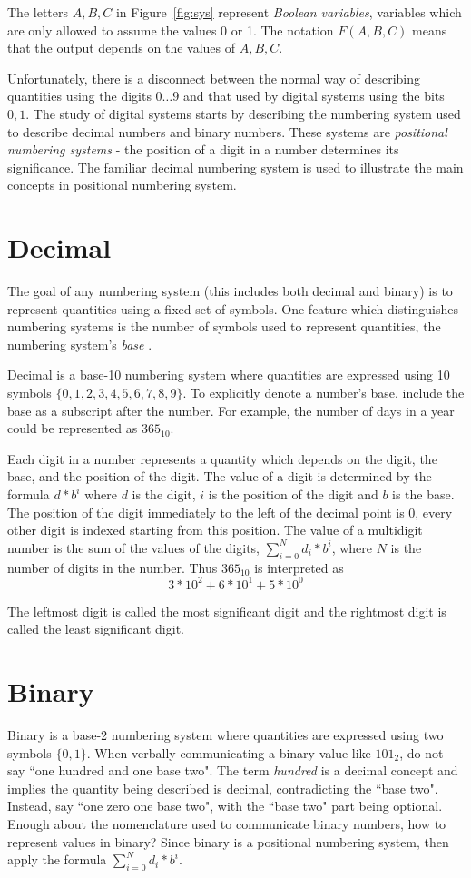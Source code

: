 The letters $A,B,C$ in Figure~\ref{fig:sys} represent {\it Boolean variables}, 
 variables which are only allowed to assume the values 
0 or 1.  The notation $F(A,B,C)$ means that the output depends on the values 
of $A,B,C$. 

Unfortunately, there is a disconnect between the normal way of describing
quantities using the digits $0 \ldots 9$ and that used by digital systems
using the bits $0,1$.  The study of digital systems starts by describing
the numbering system used to describe decimal numbers and binary numbers.  
These systems are
{\it positional numbering systems}  
- the position of a digit in a number determines its significance.  The
familiar decimal numbering system is used to illustrate the main concepts
in positional numbering system.

\section{Decimal}
The goal of any numbering system (this includes both
decimal and binary) is to represent quantities using a fixed set of
symbols.  One feature which distinguishes numbering systems is 
the number of symbols used to represent quantities, the numbering 
system's {\it base} .

Decimal is a base-10 numbering system where quantities are expressed using 
10 symbols $\{0,1,2,3,4,5,6,7,8,9\}$.  To explicitly denote a 
number's base, include the base as a subscript after the number.  For example, 
the number of days in a year could be represented as $365_{10}$. 

Each digit in a number represents a quantity which depends on the digit, 
the base, and the position of the digit.  The value of a digit is determined 
by the formula $d * b^i$ where $d$ is the digit, $i$ is the position of the 
digit and $b$ is the base.  The position of the digit immediately to the 
left of the decimal point is 0, every other digit is indexed starting from 
this position.  The value of a multidigit number is the sum of the values of 
the digits, $\sum_{i=0}^N d_i*b^i$, where $N$ is the number of digits in
the number.  Thus $365_{10}$ is interpreted as 
$$3*10^2 + 6*10^1 + 5*10^0 $$

The leftmost digit is called the most significant
digit and the rightmost digit is called the least 
significant digit.  

\section{Binary}
Binary is a base-2 numbering system where quantities are expressed using
two symbols $\{0,1\}$.  When verbally communicating a binary value like $101_2$,
do not say ``one hundred and one base two".  The term {\it hundred} is a decimal 
concept and implies the quantity being described is decimal, contradicting
the ``base two".  Instead,  say ``one zero one base two", with the ``base
two" part being optional.   Enough about the nomenclature used to communicate
binary numbers, how to represent values in binary?  Since binary is a 
positional numbering system, then apply the formula $\sum_{i=0}^N d_i*b^i$.

